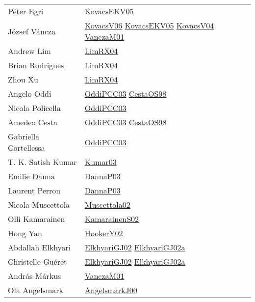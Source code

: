 {\begin{longtable}{p{4cm}p{15cm}}
P{\'{e}}ter Egri & \href{papers/KovacsEKV05.pdf}{KovacsEKV05}\cite{KovacsEKV05} \\
J{\'{o}}zsef V{\'{a}}ncza & \href{papers/KovacsV06.pdf}{KovacsV06}\cite{KovacsV06} \href{papers/KovacsEKV05.pdf}{KovacsEKV05}\cite{KovacsEKV05} \href{papers/KovacsV04.pdf}{KovacsV04}\cite{KovacsV04} \href{papers/VanczaM01.pdf}{VanczaM01}\cite{VanczaM01} \\
Andrew Lim & \href{papers/LimRX04.pdf}{LimRX04}\cite{LimRX04} \\
Brian Rodrigues & \href{papers/LimRX04.pdf}{LimRX04}\cite{LimRX04} \\
Zhou Xu & \href{papers/LimRX04.pdf}{LimRX04}\cite{LimRX04} \\
Angelo Oddi & \href{papers/OddiPCC03.pdf}{OddiPCC03}\cite{OddiPCC03} \href{papers/CestaOS98.pdf}{CestaOS98}\cite{CestaOS98} \\
Nicola Policella & \href{papers/OddiPCC03.pdf}{OddiPCC03}\cite{OddiPCC03} \\
Amedeo Cesta & \href{papers/OddiPCC03.pdf}{OddiPCC03}\cite{OddiPCC03} \href{papers/CestaOS98.pdf}{CestaOS98}\cite{CestaOS98} \\
Gabriella Cortellessa & \href{papers/OddiPCC03.pdf}{OddiPCC03}\cite{OddiPCC03} \\
T. K. Satish Kumar & \href{papers/Kumar03.pdf}{Kumar03}\cite{Kumar03} \\
Emilie Danna & \href{papers/DannaP03.pdf}{DannaP03}\cite{DannaP03} \\
Laurent Perron & \href{papers/DannaP03.pdf}{DannaP03}\cite{DannaP03} \\
Nicola Muscettola & \href{papers/Muscettola02.pdf}{Muscettola02}\cite{Muscettola02} \\
Olli Kamarainen & \href{papers/KamarainenS02.pdf}{KamarainenS02}\cite{KamarainenS02} \\
Hong Yan & \href{papers/HookerY02.pdf}{HookerY02}\cite{HookerY02} \\
Abdallah Elkhyari & \href{papers/ElkhyariGJ02.pdf}{ElkhyariGJ02}\cite{ElkhyariGJ02} \href{papers/ElkhyariGJ02a.pdf}{ElkhyariGJ02a}\cite{ElkhyariGJ02a} \\
Christelle Gu{\'{e}}ret & \href{papers/ElkhyariGJ02.pdf}{ElkhyariGJ02}\cite{ElkhyariGJ02} \href{papers/ElkhyariGJ02a.pdf}{ElkhyariGJ02a}\cite{ElkhyariGJ02a} \\
Andr{\'{a}}s M{\'{a}}rkus & \href{papers/VanczaM01.pdf}{VanczaM01}\cite{VanczaM01} \\
Ola Angelsmark & \href{papers/AngelsmarkJ00.pdf}{AngelsmarkJ00}\cite{AngelsmarkJ00} \\

\end{longtable}}
